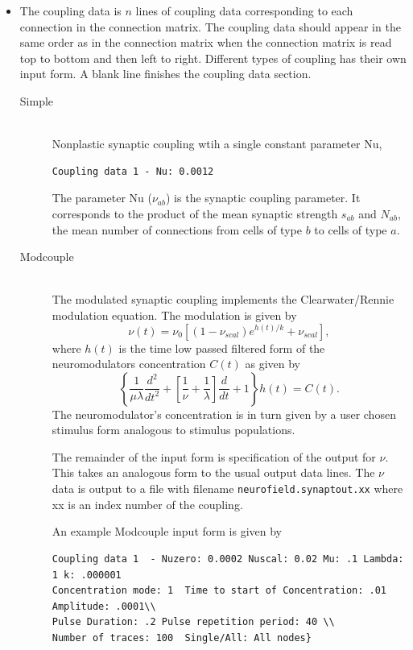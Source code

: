 \documentclass[12pt,a4paper]{article}
\newcommand{\type}[1]{ {\small\small\tt #1} }
\begin{document}
\begin{itemize}
\item The coupling data is $n$ lines of coupling data corresponding to each connection in the connection matrix. The coupling data should appear in the same order as in the connection matrix when the connection matrix is read top to bottom and then left to right. Different types of coupling has their own input form. A blank line finishes the coupling data section.

\begin{description}

	\item[Simple]\ \\
	Nonplastic synaptic coupling wtih a single constant parameter Nu,
	\begin{lstlisting}
Coupling data 1 - Nu: 0.0012
	\end{lstlisting}
	The parameter Nu ($\nu_{ab}$) is the synaptic coupling parameter. It corresponds to the product of the mean synaptic strength $s_{ab}$ and $N_{ab}$, the mean number of connections from cells of type $b$ to cells of type $a$.

	\item[Modcouple]\ \\
	The modulated synaptic coupling implements the Clearwater/Rennie modulation equation. The modulation is given by
	\[ \nu (t) = \nu_0 \left[ ( 1 - \nu_{scal} ) e^{h(t)/k} + \nu_{scal} \right], \]
	where $h(t)$ is the time low passed filtered form of the neuromodulators concentration $C(t)$ as given by
	\[
	\left\{ \frac{1}{\mu \lambda} \frac{d^2}{dt^2} +
	\left[ \frac{1}{\nu}+ \frac{1}{\lambda} 
	\right]
	\frac{d}{dt} + 1
	\right\}
	h(t) = C(t).
	\]
	The neuromodulator's concentration is in turn given by a user chosen stimulus form analogous to stimulus populations.

	The remainder of the input form is specification of the output for $\nu$.  This takes an analogous form to the usual output data lines. The $\nu$ data is output to a file with filename \type{neurofield.synaptout.xx} where xx is an index number of the coupling.

	An example Modcouple input form is given by
	\begin{lstlisting}
Coupling data 1  - Nuzero: 0.0002 Nuscal: 0.02 Mu: .1 Lambda: 1 k: .000001
Concentration mode: 1  Time to start of Concentration: .01 Amplitude: .0001\\
Pulse Duration: .2 Pulse repetition period: 40 \\
Number of traces: 100  Single/All: All nodes}
	\end{lstlisting}


\end{description}
\end{itemize}
\end{document}
